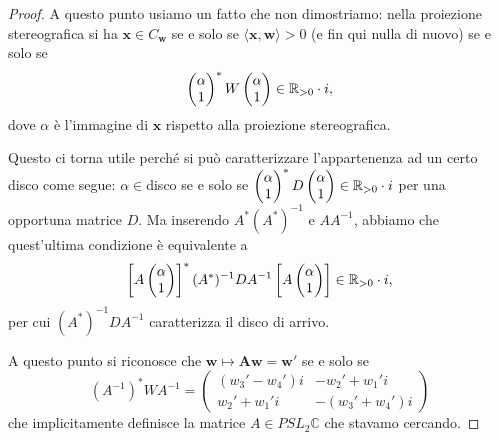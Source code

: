 \begin{proof}
	A questo punto usiamo un fatto che non dimostriamo: nella proiezione stereografica si ha $\mathbf x \in C_{\mathbf w}$ se e solo se $\langle \mathbf x, \mathbf w\rangle >0$ (e fin qui nulla di nuovo) se e solo se 
	$$\begin{pmatrix}
	\alpha \\ 1
	\end{pmatrix}^{*}
	W
	\begin{pmatrix}
	\alpha \\ 1
	\end{pmatrix}
	\in\mathbb{R}_{>0}\cdot i,$$
	dove $\alpha$ è l'immagine di $\mathbf x$ rispetto alla proiezione stereografica.
	
	Questo ci torna utile perché si può caratterizzare l'appartenenza ad un certo disco come segue: $\alpha \in$disco se e solo se $\begin{pmatrix}
	\alpha \\ 1
	\end{pmatrix}^{*}
	D
	\begin{pmatrix}
	\alpha \\ 1
	\end{pmatrix}
	\in\mathbb{R}_{>0}\cdot i$
	per una opportuna matrice $D$.
	Ma inserendo $A^{*}(A^{*})^{-1}$ e $AA^{-1}$, abbiamo che quest'ultima condizione è equivalente a 
	$$\left[A\begin{pmatrix}
	\alpha \\ 1
	\end{pmatrix}\right]^{*}
	(A^{*})^{-1}
	D
	A^{-1}
	\left[
	A
	\begin{pmatrix}
	\alpha \\ 1
	\end{pmatrix}
	\right]
	\in\mathbb{R}_{>0}\cdot i,$$
	per cui $(A^{*})^{-1}DA^{-1}$ caratterizza il disco di arrivo.
	
	A questo punto si riconosce che $\mathbf w\mapsto \mathbf{Aw} = \mathbf w'$ se e solo se 
	$$(A^{-1})^{*}WA^{-1} = \begin{pmatrix}
	(w_{3}' - w_{4}')i & -w_{2}' + w_{1}'i\\
	w_{2}' + w_{1}'i & -(w_{3}' + w_{4}')i
	\end{pmatrix}$$
	che implicitamente definisce la matrice $A\in PSL_{2}\mathbb C$ che stavamo cercando.
\end{proof}















